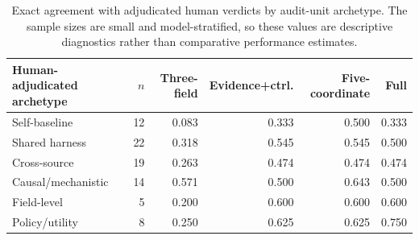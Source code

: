\begin{table}[t]
\centering
\small
\setlength{\tabcolsep}{6pt}
\begin{tabular}{lrrrrr}
\toprule
\textbf{Human-adjudicated archetype} & \textbf{$n$} &
\textbf{Three-field} & \textbf{Evidence+ctrl.} &
\textbf{Five-coordinate} & \textbf{Full} \\
\midrule
Self-baseline & 12 & 0.083 & 0.333 & 0.500 & 0.333 \\
Shared harness & 22 & 0.318 & 0.545 & 0.545 & 0.500 \\
Cross-source & 19 & 0.263 & 0.474 & 0.474 & 0.474 \\
Causal/mechanistic & 14 & 0.571 & 0.500 & 0.643 & 0.500 \\
Field-level & 5 & 0.200 & 0.600 & 0.600 & 0.600 \\
Policy/utility & 8 & 0.250 & 0.625 & 0.625 & 0.750 \\
\bottomrule
\end{tabular}
\caption{Exact agreement with adjudicated human verdicts by audit-unit
archetype. The sample sizes are small and model-stratified, so these values are
descriptive diagnostics rather than comparative performance estimates.}
\label{tab:rule-reliability-by-archetype}
\end{table}
